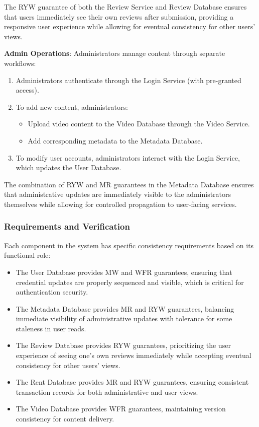 The RYW guarantee of both the Review Service and Review Database
ensures that users immediately see their own reviews after
submission, providing a responsive user experience while allowing for
eventual consistency for other users' views.

\textbf{Admin Operations}: Administrators manage content through
separate workflows:

\begin{enumerate}
\item Administrators authenticate through the Login Service (with
  pre-granted access).
\item To add new content, administrators:
  \begin{itemize}
    \item Upload video content to the Video Database through the
      Video Service.
    \item Add corresponding metadata to the Metadata Database.
  \end{itemize}
\item To modify user accounts, administrators interact with the
  Login Service, which updates the User Database.
\end{enumerate}

The combination of RYW and MR guarantees in the Metadata Database
ensures that administrative updates are immediately visible to the
administrators themselves while allowing for controlled propagation
to user-facing services.

\subsubsection{Requirements and Verification}

Each component in the system has specific consistency requirements
based on its functional role:

\begin{itemize}
\item The User Database provides MW and WFR guarantees, ensuring
  that credential updates are properly sequenced and visible, which
  is critical for authentication security.

\item The Metadata Database provides MR and RYW guarantees,
  balancing immediate visibility of administrative updates with
  tolerance for some staleness in user reads.

\item The Review Database provides RYW guarantees, prioritizing the
  user experience of seeing one's own reviews immediately while
  accepting eventual consistency for other users' views.

\item The Rent Database provides MR and RYW guarantees, ensuring
  consistent transaction records for both administrative and user views.

\item The Video Database provides WFR guarantees, maintaining
  version consistency for content delivery.
\end{itemize}

